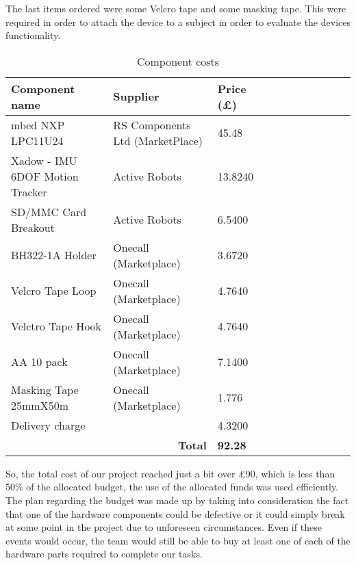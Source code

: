 The last items ordered were some Velcro tape and some masking tape. This were required in order to attach the device to a subject in order to evaluate the devices functionality.
\begin{table}[h]
	\centering
	\begin{tabular}{|l|l|l|l|l|l|l|l|l|l|l|}
		\hline
		Component name & Supplier & Price (\pounds) \\
		\hline
		mbed NXP LPC11U24 & RS Components Ltd (MarketPlace) & 45.48\\
		Xadow - IMU 6DOF Motion Tracker & Active Robots & 13.8240 \\
		SD/MMC Card Breakout & Active Robots & 6.5400 \\
		BH322-1A  Holder &  Onecall (Marketplace) & 3.6720 \\
		Velcro Tape Loop &  Onecall (Marketplace) & 4.7640 \\
		Velctro Tape Hook &  Onecall (Marketplace) & 4.7640 \\
		AA 10 pack &  Onecall (Marketplace) & 7.1400 \\
		Masking Tape 25mmX50m &  Onecall (Marketplace) &1.776 \\
		Delivery charge &  & 4.3200	\\
		\hline
		\multicolumn{2}{|r|}{\textbf{Total}} & \textbf{92.28} \\
		\hline
	\end{tabular}
	\caption{Component costs}
	\label{table: 1}
\end{table}

So, the total cost of our project reached just a bit over £90, which is less than 50\% of the allocated budget,  the use of the allocated funds was used efficiently. The plan regarding the budget was made up by taking into consideration the fact that one of the hardware components could be defective or it could simply break at some point in the project due to unforeseen circumstances. Even if these events would occur, the team would still be able to buy at least one of each of the hardware parts required to complete our tasks.